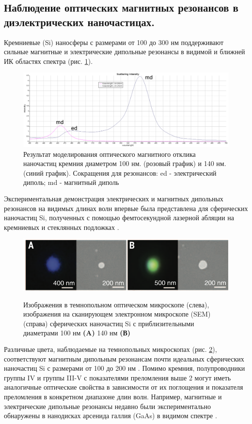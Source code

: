 \subsection{Наблюдение оптических магнитных резонансов в диэлектрических наночастицах.}


Кремниевые (Si) наносферы с размерами от 100 до 300 нм поддерживают сильные магнитные и электрические дипольные резонансы в видимой и ближней ИК областях спектра (рис. \ref{fig2}). 
 \begin{figure}[h]
	\centering
	\includegraphics[width=0.7\linewidth]{images/graph1.png}
	\caption{Результат моделирования оптического магнитного отклика наночастиц кремния  диаметром 100 нм. (розовый график) и 140 нм. (синий график).  Сокращения для резонансов: ed - электрический диполь; md - магнитный диполь}
	\label{fig2}
\end{figure}
Экспериментальная демонстрация электрических и магнитных дипольных резонансов на видимых длинах волн впервые была представлена для сферических наночастиц Si, полученных с помощью фемтосекундной лазерной абляции на кремниевых и стеклянных подложках \cite{kuznetsov2012luk}. 
 \begin{figure}[h]
	\centering
	\includegraphics[width=0.7\linewidth]{images/fig2.png}
	\caption{ Изображения в темнопольном оптическом микроскопе (слева), изображения на сканирующем электронном микроскопе (SEM) (справа)  сферических наночастиц Si с приблизительными диаметрами 100 нм \textbf{(A)} 140 нм \textbf{(В)}} \cite{kuznetsov2012luk}
    \label{fig3}
\end{figure}
\hspace*{2mm}
Различные цвета, наблюдаемые на темнопольных микроскопах (рис. \ref{fig3}), соответствуют магнитным дипольным резонансам почти идеальных сферических наночастиц Si с размерами от 100 до 200 нм \cite{kuznetsov2012luk}.  Помимо кремния, полупроводники группы IV и группы III-V с показателями преломления выше 2 могут иметь аналогичные оптические свойства в зависимости от их поглощения и показателя преломления в конкретном диапазоне длин волн. Например, магнитные и электрические дипольные резонансы недавно были экспериментально обнаружены в нанодисках арсенида галлия (GaAs) в видимом спектре \cite{person2013demonstration}.


